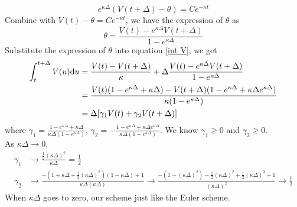 \documentclass{ws-ijfe}
\begin{document}
\begin{equation*}
  e^{\kappa\Delta}(V(t+\Delta)-\theta)=Ce^{-\kappa  t}
\end{equation*}
Combine with $V(t)-\theta= Ce^{-\kappa t}$, we have the expression of $\theta$ as
\begin{equation*}
\theta=\frac{V(t)-e^{\kappa\Delta}V(t+\Delta)}{1-e^{\kappa\Delta}}
\end{equation*}
Substitute the expression of $\theta$ into equation \eqref{int V}, we get
\begin{equation*}
  \begin{split}
    \int_{t}^{t+\Delta}V(u)\mathrm{d} u &= \frac{V(t)-V(t+\Delta)}{\kappa}+\Delta\frac{V(t)-e^{\kappa\Delta}V(t+\Delta)}{1-e^{\kappa\Delta}}  \\
    &=\frac{V(t)(1-e^{\kappa\Delta}+\kappa\Delta)-V(t+\Delta)(1-e^{\kappa\Delta}+\kappa\Delta e^{\kappa\Delta})}{\kappa(1-e^{\kappa\Delta})} \\
     &=\Delta[\gamma_1 V(t)+\gamma_2 V(t+\Delta)]
  \end{split}
\end{equation*}
where
$\gamma_1 = \frac{1-e^{\kappa\Delta}+\kappa\Delta}{\kappa\Delta(1-e^{\kappa\Delta})}$,
$\gamma_2 = -\frac{1-e^{\kappa\Delta}+\kappa\Delta e^{\kappa\Delta}}{\kappa\Delta(1-e^{\kappa\Delta})}$.
We know $\gamma_1\geq 0$ and $\gamma_2\geq 0$.\\
As $\kappa\Delta\rightarrow 0$, \begin{align*}
 \gamma_1 &\rightarrow\frac{\frac{1}{2}(\kappa\Delta)^2}{\kappa\Delta}=\frac{1}{2} \\
  \gamma_2 &\rightarrow\frac{-(1+\kappa\Delta+\frac{1}{2}(\kappa\Delta)^2)(1-\kappa\Delta)+1}{\kappa\Delta(\kappa\Delta)}
  \rightarrow\frac{-(1-(\kappa\Delta)^2)-\frac{1}{2}(\kappa\Delta)^2+\frac{1}{2}(\kappa\Delta)^3+1}{(\kappa\Delta)^2}\rightarrow\frac{1}{2}
\end{align*}
When $\kappa\Delta$ goes to zero, our scheme just like the Euler scheme.
\end{document}
